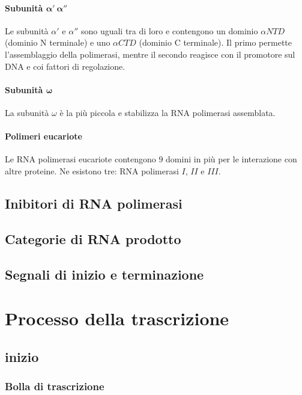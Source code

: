 			\paragraph{Subunit\`a $\mathbf{\alpha'\ \alpha''}$}
			Le subunit\`a $\alpha'$ e $\alpha''$ sono uguali tra di loro e contengono un dominio $\alpha NTD$ (dominio N terminale) e uno $\alpha CTD$ (dominio C terminale).
			Il primo permette l'assemblaggio della polimerasi, mentre il secondo reagisce con il promotore sul DNA e coi fattori di regolazione.

			\paragraph{Subunit\`a $\mathbf{\omega}$}
			La subunit\`a $\omega$ \`e la pi\`u piccola e stabilizza la RNA polimerasi assemblata.

			\paragraph{Polimeri eucariote}
			Le RNA polimerasi eucariote contengono $9$ domini in pi\`u per le interazione con altre proteine.
			Ne esistono tre: RNA polimerasi $I$, $II$ e $III$.
		

	\subsection{Inibitori di RNA polimerasi}

	\subsection{Categorie di RNA prodotto}

	\subsection{Segnali di inizio e terminazione}

\section{Processo della trascrizione}

	\subsection{inizio}

		\subsubsection{Bolla di trascrizione}

